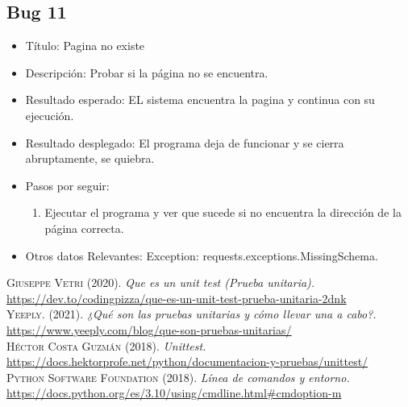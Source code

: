 \documentclass[conference]{IEEEtran}
\begin{document}
\subsection*{Bug 11}
\begin{itemize}
\item Título: Pagina no existe

\item Descripción: Probar si la página no se encuentra.

\item Resultado esperado: EL sistema encuentra la pagina y continua con su ejecución.

\item Resultado desplegado: El programa deja de funcionar y se cierra abruptamente, se quiebra. 

\item Pasos por seguir: 
\begin{enumerate}
\item Ejecutar el programa y ver que sucede si no encuentra la dirección de la página correcta.
\end{enumerate}
\item Otros datos Relevantes: Exception: requests.exceptions.MissingSchema.

\end{itemize}






\normalsize

\begin{thebibliography}{}


 \textsc{Giuseppe Vetri} (2020). \textit{Que es un unit test (Prueba unitaria).} \url{https://dev.to/codingpizza/que-es-un-unit-test-prueba-unitaria-2dnk}\\

 \textsc{Yeeply.} (2021). \textit{¿Qué son las pruebas unitarias y cómo llevar una a cabo?.} \url{https://www.yeeply.com/blog/que-son-pruebas-unitarias/} \\

 \textsc{Héctor Costa Guzmán} (2018). \textit{Unittest.} \url{https://docs.hektorprofe.net/python/documentacion-y-pruebas/unittest/} \\

 \textsc{Python Software Foundation} (2018). \textit{Línea de comandos y entorno.} \url{https://docs.python.org/es/3.10/using/cmdline.html#cmdoption-m} \\



\end{thebibliography}
\end{document}
